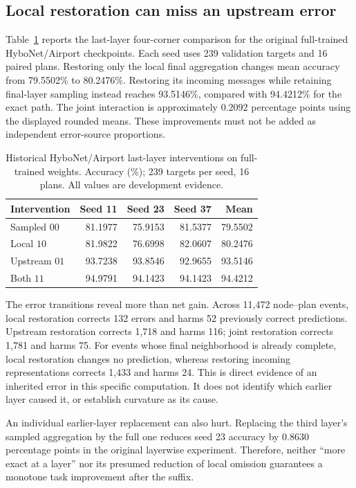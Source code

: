\subsection{Local restoration can miss an upstream error}
Table~\ref{tab:airport} reports the last-layer four-corner comparison for the original full-trained HyboNet/Airport checkpoints. Each seed uses 239 validation targets and 16 paired plans. Restoring only the local final aggregation changes mean accuracy from 79.5502\% to 80.2476\%. Restoring its incoming messages while retaining final-layer sampling instead reaches 93.5146\%, compared with 94.4212\% for the exact path. The joint interaction is approximately $0.2092$ percentage points using the displayed rounded means. These improvements must not be added as independent error-source proportions.

\begin{table}[t]
\caption{Historical HyboNet/Airport last-layer interventions on full-trained weights. Accuracy (\%); 239 targets per seed, 16 plans. All values are development evidence.}
\label{tab:airport}
\centering
\begin{tabular}{lrrrr}
\toprule
Intervention & Seed 11 & Seed 23 & Seed 37 & Mean\\
\midrule
Sampled $00$ & 81.1977 & 75.9153 & 81.5377 & 79.5502\\
Local $10$ & 81.9822 & 76.6998 & 82.0607 & 80.2476\\
Upstream $01$ & 93.7238 & 93.8546 & 92.9655 & 93.5146\\
Both $11$ & 94.9791 & 94.1423 & 94.1423 & 94.4212\\
\bottomrule
\end{tabular}
\end{table}

The error transitions reveal more than net gain. Across 11,472 node--plan events, local restoration corrects 132 errors and harms 52 previously correct predictions. Upstream restoration corrects 1,718 and harms 116; joint restoration corrects 1,781 and harms 75. For events whose final neighborhood is already complete, local restoration changes no prediction, whereas restoring incoming representations corrects 1,433 and harms 24. This is direct evidence of an inherited error in this specific computation. It does not identify which earlier layer caused it, or establish curvature as its cause.

An individual earlier-layer replacement can also hurt. Replacing the third layer's sampled aggregation by the full one reduces seed 23 accuracy by 0.8630 percentage points in the original layerwise experiment. Therefore, neither ``more exact at a layer'' nor its presumed reduction of local omission guarantees a monotone task improvement after the suffix.

